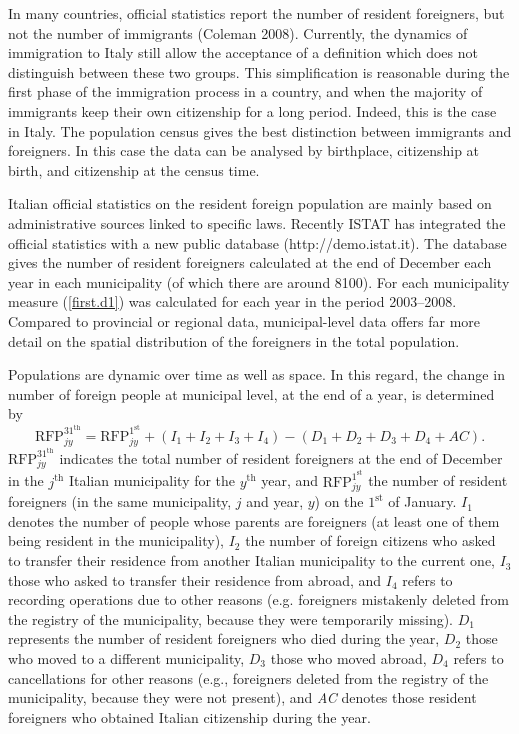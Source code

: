 \documentclass[10pt]{article}
\theoremstyle{definition}
\theoremstyle{plain}
\begin{document}
In many countries, official statistics report the number of resident foreigners, but not the number of immigrants (Coleman 2008). Currently, the dynamics of immigration to Italy still allow the acceptance of a definition which does not distinguish between these two groups. This simplification is reasonable during the first phase of the immigration process in a country, and when the majority of immigrants keep their own citizenship for a long period. Indeed, this is the case in Italy. The population census gives the best distinction between immigrants and foreigners. In this case the data can be analysed by birthplace, citizenship at birth, and citizenship at the census time. 
 
Italian official statistics on the resident foreign population are mainly based on administrative sources linked to specific laws. Recently ISTAT has integrated the official statistics with a new public database (http://demo.istat.it). The database gives the number of resident foreigners calculated at the end of December each year in each municipality (of which there are around 8100). For each municipality measure (\ref{first.d1}) was calculated for each year in the period 2003--2008. Compared to provincial or regional data, municipal-level data offers far more detail on the spatial distribution of the foreigners in the total population.
 
Populations are dynamic over time as well as space. In this regard, the change in number of foreign people at municipal level, at the end of a year, is determined by
$$
\text{RFP}^{31^\text{th}}_{jy} = \text{RFP}^{1^\text{st}}_{jy} + (I_1 + I_2 + I_3+ I_4) - (D_1 + D_2 + D_3 + D_4 + AC).
$$ 
$\text{RFP}^{31^\text{th}}_{jy}$ indicates the total number of resident foreigners at the end of December in the $j^\text{th}$ Italian municipality for the $y^\text{th}$ year, and $\text{RFP}^{1^\text{st}}_{jy}$ the number of resident foreigners (in the same municipality, $j$ and year, $y$) on the $1^\text{st}$ of January. $I_{1}$ denotes the number of people whose parents are foreigners (at least one of them being resident in the municipality), $I_{2}$ the number of foreign citizens who asked to transfer their residence from another Italian municipality to the current one, $I_{3}$ those who asked to transfer their residence from abroad, and $I_{4}$ refers to recording operations due to other reasons (e.g. foreigners mistakenly deleted from the registry of the municipality, because they were temporarily missing). $D_{1}$ represents the number of resident foreigners who died during the year, $D_{2}$ those who moved to a different municipality, $D_{3}$ those who moved abroad, $D_{4}$ refers to cancellations for other reasons (e.g., foreigners deleted from the registry of the municipality, because they were not present), and \textit{AC} denotes those resident foreigners who obtained Italian citizenship during the year. 
\end{document}
